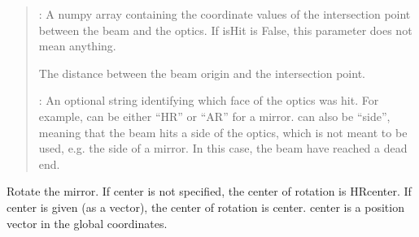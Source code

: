 \documentclass[letterpaper,10pt,english]{sphinxmanual}
\begin{document}
\begin{fulllineitems}
\begin{fulllineitems}
\begin{quote}
:
A numpy array containing the coordinate values of the intersection
point between the beam and the optics. If isHit is False, this parameter
does not mean anything.

The distance between the beam origin and the intersection point.

:
An optional string identifying which face of the optics was hit.
For example,  can be either ``HR'' or ``AR'' for a mirror.
 can also be ``side'', meaning that the beam hits a side
of the optics, which is not meant to be used, e.g. the side of a mirror.
In this case, the beam have reached a dead end.
\end{quote}

\end{fulllineitems}


\begin{fulllineitems}
\label{api/gtrace:gtrace.optcomp.Mirror.rotate}
Rotate the mirror. If center is not specified, the center of rotation is
HRcenter. If center is given (as a vector), the center of rotation is
center. center is a position vector in the global coordinates.

\end{fulllineitems}


\begin{fulllineitems}
\label{api/gtrace:gtrace.optcomp.Mirror.translate}
\end{fulllineitems}


\end{fulllineitems}

\end{document}
